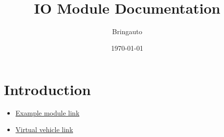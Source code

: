 \documentclass{article}
\title{IO Module Documentation}
\author{Bringauto}
\date{\today}
\begin{document}
\maketitle %

\section{Introduction}

\begin{itemize}
    \item \href{\getref{example_module}}{Example module link}
    \item \href{\getref{virtual_vehicle}}{Virtual vehicle link}
\end{itemize}
\end{document}
